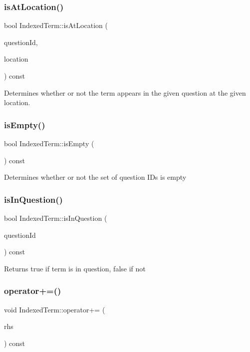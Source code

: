 \subsubsection{\texorpdfstring{is\+At\+Location()}{isAtLocation()}}
{\footnotesize\ttfamily bool Indexed\+Term\+::is\+At\+Location (\begin{DoxyParamCaption}\item[{int}]{question\+Id,  }\item[{int}]{location }\end{DoxyParamCaption}) const}

Determines whether or not the term appears in the given question at the given location. \mbox{\label{classIndexedTerm_aeb3a182538b603b10819d6b3310f6747}} 
\subsubsection{\texorpdfstring{is\+Empty()}{isEmpty()}}
{\footnotesize\ttfamily bool Indexed\+Term\+::is\+Empty (\begin{DoxyParamCaption}{ }\end{DoxyParamCaption}) const}

Determines whether or not the set of question I\+Ds is empty \mbox{\label{classIndexedTerm_a1b78549f18a68457fcd438ca33d7ab87}} 
\subsubsection{\texorpdfstring{is\+In\+Question()}{isInQuestion()}}
{\footnotesize\ttfamily bool Indexed\+Term\+::is\+In\+Question (\begin{DoxyParamCaption}\item[{int}]{question\+Id }\end{DoxyParamCaption}) const}

Returns true if term is in question, false if not \mbox{\label{classIndexedTerm_a826c10c65c29cb7128e485906f884d31}} 
\subsubsection{\texorpdfstring{operator+=()}{operator+=()}}
{\footnotesize\ttfamily void Indexed\+Term\+::operator+= (\begin{DoxyParamCaption}\item[{const \mbox{\hyperlink{classIndexedTerm}{Indexed\+Term}} \&}]{rhs }\end{DoxyParamCaption}) const}

